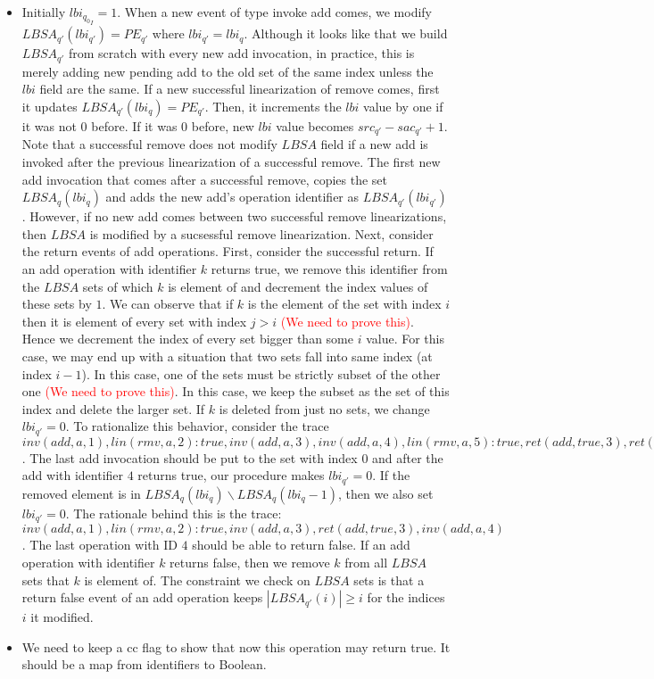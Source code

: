\begin{itemize}
\begin{itemize}
\item[$LBSA$] Initially $lbi_{{q_0}_I} = 1$. When a new event of type invoke add comes, we modify $LBSA_{q'}(lbi_{q'}) = PE_{q'}$ where $lbi_{q'} = lbi_q$. Although it looks like that we build $LBSA_{q'}$ from scratch with every new add invocation, in practice, this is merely adding new pending add to the old set of the same index unless the $lbi$ field are the same. If a new successful linearization of remove comes, first it updates $LBSA_{q'}(lbi_q) = PE_{q'}$. Then, it increments the $lbi$ value by one if it was not $0$ before. If it was $0$ before, new $lbi$ value becomes $src_{q'} - sac_{q'}+1$. Note that a successful remove does not modify $LBSA$ field if a new add is invoked after the previous linearization of a successful remove. The first new add invocation that comes after a successful remove, copies the set $LBSA_{q}(lbi_q)$ and adds the new add's operation identifier as $LBSA_{q'}(lbi_{q'})$. However, if no new add comes between two successful remove linearizations, then $LBSA$ is modified by a sucsessful remove linearization. Next, consider the return events of add operations. First, consider the successful return. If an add operation with identifier $k$ returns true, we remove this identifier from the $LBSA$ sets of which $k$ is element of and decrement the index values of these sets by $1$. We can observe that if $k$ is the element of the set with index $i$ then it is element of every set with index $j>i$ \textcolor{red}{(We need to prove this)}. Hence we decrement the index of every set bigger than some $i$ value. For this case, we may end up with a situation that two sets fall into same index (at index $i-1$). In this case, one of the sets must be strictly subset of the other one \textcolor{red}{(We need to prove this)}. In this case, we keep the subset as the set of this index and delete the larger set. If $k$ is deleted from just no sets, we change $lbi_{q'} = 0$. To rationalize this behavior, consider the trace $inv(add,a,1), lin(rmv,a,2):true, inv(add,a,3), inv(add,a,4), lin(rmv,a,5):true, ret(add,true,3), ret(add,true,4), inv(add,a,6)$. The last add invocation should be put to the set with index $0$ and after the add with identifier $4$ returns true, our procedure makes $lbi_{q'} = 0$. If the removed element is in $LBSA_q(lbi_q) \backslash LBSA_q(lbi_q -1)$, then we also set $lbi_{q'} = 0$. The rationale behind this is the trace: $inv(add,a,1), lin(rmv,a,2):true, inv(add,a,3), ret(add,true,3), inv(add,a,4)$. The last operation with ID $4$ should be able to return false. If an add operation with identifier $k$ returns false, then we remove $k$ from all $LBSA$ sets that $k$ is element of. The constraint we check on $LBSA$ sets is that a return false event of an add operation keeps $|LBSA_{q'}(i)| \geq i$ for the indices $i$ it modified.
\item [$CC$] We need to keep a cc flag to show that now this operation may return true. It should be a map from identifiers to Boolean.
\end{itemize}
\end{itemize}
